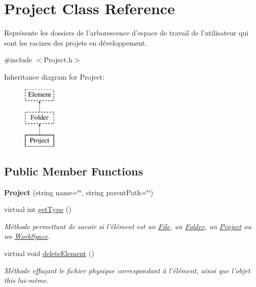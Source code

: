 \hypertarget{class_project}{
\section{Project Class Reference}
\label{class_project}
}


Représente les dossiers de l'arborescence d'espace de travail de l'utilisateur qui sont les racines des projets en développement.  




{\ttfamily \#include $<$Project.h$>$}

Inheritance diagram for Project:\begin{figure}[H]
\begin{center}
\leavevmode
\includegraphics[height=3.000000cm]{class_project}
\end{center}
\end{figure}
\subsection*{Public Member Functions}
\begin{DoxyCompactItemize}
\item 
\hypertarget{class_project_ac8d6f563b529c54385b68ac93998b615}{
{\bfseries Project} (string name=\char`\"{}\char`\"{}, string parentPath=\char`\"{}\char`\"{})}
\label{class_project_ac8d6f563b529c54385b68ac93998b615}

\item 
virtual int \hyperlink{class_project_ab9adc05a12220fbdec7822bdcd15389b}{getType} ()
\begin{DoxyCompactList}\small\item\em Méthode permettant de savoir si l'élément est un \hyperlink{class_file}{File}, un \hyperlink{class_folder}{Folder}, un \hyperlink{class_project}{Project} ou un \hyperlink{class_work_space}{WorkSpace}. \item\end{DoxyCompactList}\item 
\hypertarget{class_project_aae91a6737175147e6e21ba6c168dd010}{
virtual void \hyperlink{class_project_aae91a6737175147e6e21ba6c168dd010}{deleteElement} ()}
\label{class_project_aae91a6737175147e6e21ba6c168dd010}

\begin{DoxyCompactList}\small\item\em Méthode effaçant le fichier physique correspondant à l'élément, ainsi que l'objet this lui-\/même. \item\end{DoxyCompactList}\end{DoxyCompactItemize}


